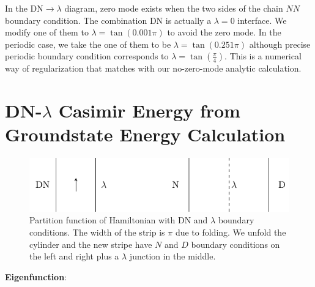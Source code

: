 \documentclass{article}
\begin{document}
In the DN$\rightarrow \lambda$ diagram, zero mode exists when the two sides of the chain $NN$ boundary condition. The combination DN is actually a $\lambda = 0$ interface. We modify one of them to $\lambda = \tan( 0.001 \pi )$ to avoid the zero mode. In the periodic case, we take the one of them to be $\lambda = \tan(0.251\pi)$ although precise periodic boundary condition corresponds to $\lambda = \tan(\frac{\pi}{4})$. This is a numerical way of regularization that matches with our no-zero-mode analytic calculation. 




\appendix


\section{DN-$\lambda$ Casimir Energy from Groundstate Energy Calculation}
\label{app:gnd_dn_lambda}


\begin{figure}[h]
\centering
\includegraphics[width=	extwidth]{fig_DN-lambda-gnd}\caption{Partition function of Hamiltonian with DN and $\lambda$ boundary conditions. The width of the strip is $\pi$ due to folding. We unfold the cylinder and the new stripe have $N$ and $D$ boundary conditions on the left and right plus a $\lambda$ junction in the middle. }
\label{fig:DN-lambda-gnd}
\end{figure}

{\bf Eigenfunction}: 
\end{document}
